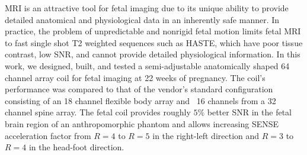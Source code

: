 MRI is an attractive tool for fetal imaging due to its unique ability to provide detailed anatomical and physiological
data in an inherently safe manner. In practice, the problem of unpredictable and nonrigid fetal motion limits fetal MRI
to fast single shot T2 weighted sequences such as HASTE, which have poor tissue contrast, low SNR, and cannot provide
detailed physiological information. In this work, we designed, built, and tested a semi-adjustable anatomically shaped
64 channel array coil for fetal imaging at 22 weeks of pregnancy. The coil's performance was compared to that of the
vendor's standard configuration consisting of an 18 channel flexible body array and ~16 channels from a 32 channel spine
array. The fetal coil provides roughly $5\%$ better SNR in the fetal brain region of an anthropomorphic phantom and
allows increasing SENSE acceleration factor from $R=4$ to $R=5$ in the right-left direction and $R=3$ to $R=4$ in the
head-foot direction.
